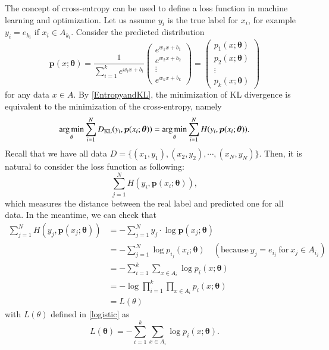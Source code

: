 The concept of cross-entropy  can be used to define a loss function in machine learning and optimization. 
Let us assume $y_i$ is the true label for $x_i$, for example $y_i = e_{k_i}$ if $x_i \in A_{k_i}$. Consider the predicted distribution 
\begin{equation}\label{key}
\bm p(x; \bm \theta) = \frac{1}{\sum\limits_{i=1}^k e^{w_i x+b_i}}
\begin{pmatrix}
e^{w_1 x+b_1}\\
e^{w_2 x+b_2}\\
\vdots\\
e^{w_k x+b_k}
\end{pmatrix}
= \begin{pmatrix}
p_1(x; \bm\theta) \\
p_2(x; \bm\theta) \\
\vdots \\
p_k(x; \bm\theta)
\end{pmatrix}
\end{equation}
for any data $x \in A$.
By \eqref{EntropyandKL}, the minimization of KL divergence is equivalent to the minimization of the cross-entropy, namely
\begin{equation}
\mathop{\arg\min}_{\theta} \sum_{i=1}^N D_{\rm KL}(y_i,\bm p(x_i; \bm \theta)) = \mathop{\arg\min}_{\theta} \sum_{i=1}^N H(y_i, \bm p(x_i; \bm \theta)).
\end{equation} 
Recall that we have all data $D = \{(x_1,y_1),(x_2,y_2),\cdots, (x_N, y_N)\}$.  Then, it is natural to consider the 
loss function as following:
\begin{equation}
\sum_{j=1}^N H(y_i, \bm p(x_i; \bm \theta)),
\end{equation}
which measures the distance between the real label and predicted one for all data.
In the meantime, we can check that
\begin{equation}
\begin{aligned}
\sum_{j=1}^N H(y_j, \bm p(x_j; \bm \theta))&=-\sum_{j=1}^N y_j  \cdot \log  \bm p(x_j; \bm \theta )\\
&=-\sum_{j=1}^N  \log p_{i_j}(x_i; \bm \theta) \quad (\text{because}~y_j = e_{i_j}~\text{for}~x_j \in A_{i_j})\\
&=-\sum_{i=1}^k \sum_{x\in A_i}  \log p_{i}(x; \bm \theta) \\
&=-\log \prod_{i=1}^k \prod_{x\in A_i}   p_{i}(x; \bm \theta)\\
& = L(\theta)
\end{aligned}
\end{equation}
with $L(\theta)$ defined in \eqref{logistic} as 
\begin{equation}
L(\bm \theta) = - \sum_{i=1}^k \sum_{x\in A_i} \log p_{i}(x;\bm \theta).
\end{equation}

